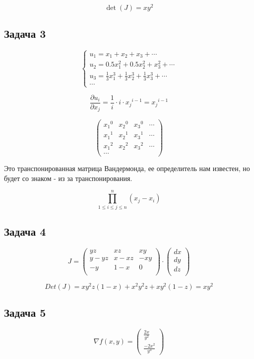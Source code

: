 \documentclass[a4paper,12pt]{article}
\begin{document}
\[
\det(J) = xy^2
\]

\subsection{Задача 3}
\[
\begin{cases}
    u_1 = x_1 + x_2 + x_3 + \cdots  \\
    u_2 = 0.5x_1^2 + 0.5 x_2^2 + x_3^2 + \cdots \\
    u_3 = \frac{1}{3}x_1^3 + \frac{1}{3}x_2^3 + \frac{1}{3}x_3^3 + \cdots \\
    \cdots
\end{cases}
\]

\[
\frac{\partial u_i}{\partial x_j} = \frac{1}{i}\cdot i \cdot {x_j}^{i-1}={x_j}^{i-1}
\]

\[
\begin{pmatrix}
    {x_1}^{0} & {x_2}^{0} & {x_3}^{0} & \cdots \\
    {x_1}^{1} & {x_2}^{1} & {x_3}^{1} & \cdots \\ 
    {x_1}^{2} & {x_2}^{2} & {x_3}^{2} & \cdots \\
    \cdots 
\end{pmatrix}
\]

Это транспонированная матрица Вандермонда, ее определитель нам известен, но будет со знаком - из за транспонирования.

\[
\prod_{1\le i \le j \le n}^{n} (x_j - x_i)
\]

\subsection{Задача 4}
\[
J =
\begin{pmatrix}
    yz & xz & xy \\
    y-yz & x-xz & -xy \\
    -y & 1-x & 0 \\
\end{pmatrix} \cdot \begin{pmatrix}
    dx \\
    dy \\
    dz \\
\end{pmatrix} 
\]

\[
Det(J) = xy^2z(1-x)+x^2y^2z+xy^2(1-z) = xy^2
\]

\subsection{Задача 5}
\[
\nabla f(x, y) = 
\begin{pmatrix}
    \frac{2x}{y^2} \\
    \frac{-2x^2}{y^3}
\end{pmatrix}
\]
\end{document}
